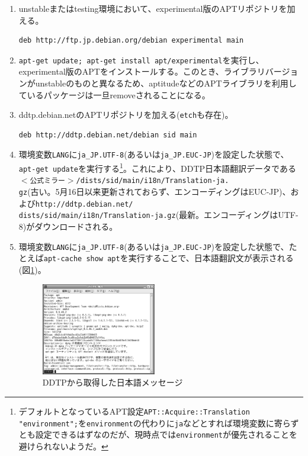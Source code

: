 \documentclass[mingoth,a4paper]{jsarticle}
\begin{document}
\begin{enumerate}
\item unstableまたはtesting環境において、experimental版のAPTリポジトリを加える。

  \begin{screen}
\begin{verbatim}
deb http://ftp.jp.debian.org/debian experimental main
\end{verbatim}
  \end{screen}
\item \texttt{apt-get update; apt-get install apt/experimental\return}を実行し、experimental版のAPTをインストールする。このとき、ライブラリバージョンがunstableのものと異なるため、aptitudeなどのAPTライブラリを利用しているパッケージは一旦removeされることになる。
\item ddtp.debian.netのAPTリポジトリを加える(\texttt{etch}も存在)。

  \begin{screen}
\begin{verbatim}
deb http://ddtp.debian.net/debian sid main
\end{verbatim}
  \end{screen}
\item 環境変数\texttt{LANG}に\texttt{ja\_JP.UTF-8}(あるいは\texttt{ja\_JP.EUC-JP})を設定した状態で、\texttt{apt-get update\return}を実行する\footnote{デフォルトとなっているAPT設定\texttt{APT::Acquire::Translation "environment";}を\texttt{environment}の代わりに\texttt{ja}などとすれば環境変数に寄らずとも設定できるはずなのだが、現時点では\texttt{environment}が優先されることを避けられないようだ。}。これにより、DDTP日本語翻訳データである\texttt{$<$公式ミラー$>$/dists/sid/main/i18n/Translation-ja.\\gz}(古い。5月16日以来更新されておらず、エンコーディングはEUC-JP)、および\texttt{http://ddtp.debian.net/\\dists/sid/main/i18n/Translation-ja.gz}(最新。エンコーディングはUTF-8)がダウンロードされる。%
\item 環境変数\texttt{LANG}に\texttt{ja\_JP.UTF-8}(あるいは\texttt{ja\_JP.EUC-JP})を設定した状態で、たとえば\texttt{apt-cache show apt\return}を実行することで、日本語翻訳文が表示される(図\ref{fig:apti18n})。

  \begin{figure}[htbp]
    \begin{center}
      \includegraphics[width=5cm]{image200610/apti18n.eps}
    \end{center}
    \caption{DDTPから取得した日本語メッセージ}
    \label{fig:apti18n}
  \end{figure}


\end{enumerate}
\end{document}
